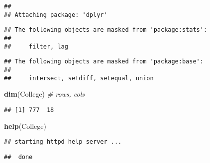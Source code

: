 \documentclass[
]{article}
\newenvironment{Shaded}{\begin{snugshade}}{\end{snugshade}}
\newcommand{\CommentTok}[1]{\textcolor[rgb]{0.56,0.35,0.01}{\textit{#1}}}
\newcommand{\FunctionTok}[1]{\textcolor[rgb]{0.13,0.29,0.53}{\textbf{#1}}}
\newcommand{\NormalTok}[1]{#1}
\newcommand{\OtherTok}[1]{\textcolor[rgb]{0.56,0.35,0.01}{#1}}
\newcommand{\SpecialCharTok}[1]{\textcolor[rgb]{0.81,0.36,0.00}{\textbf{#1}}}
\begin{document}
\begin{verbatim}
## 
## Attaching package: 'dplyr'
\end{verbatim}

\begin{verbatim}
## The following objects are masked from 'package:stats':
## 
##     filter, lag
\end{verbatim}

\begin{verbatim}
## The following objects are masked from 'package:base':
## 
##     intersect, setdiff, setequal, union
\end{verbatim}

\begin{Shaded}
\begin{Highlighting}[]
\FunctionTok{dim}\NormalTok{(College) }\CommentTok{\# rows, cols}
\end{Highlighting}
\end{Shaded}

\begin{verbatim}
## [1] 777  18
\end{verbatim}

\begin{Shaded}
\begin{Highlighting}[]
\FunctionTok{help}\NormalTok{(College)}
\end{Highlighting}
\end{Shaded}

\begin{verbatim}
## starting httpd help server ...
\end{verbatim}

\begin{verbatim}
##  done
\end{verbatim}

\begin{Shaded}
\end{Shaded}
\end{document}
